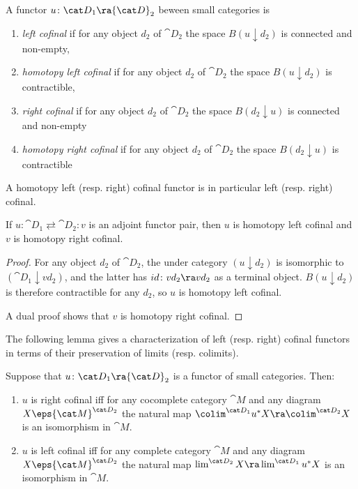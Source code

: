 \begin{defn}
\label{defn:coffunct}
A functor $u \colon {\cat D}_1 \ra {\cat D}_2$ beween small categories is
\begin{enumerate}
\item
{\it left cofinal} if for any object $d_2$ of ${\cat D}_2$ the space $B(u \downarrow d_2)$ is connected and non-empty,
\item
{\it homotopy left cofinal} if for any object $d_2$ of ${\cat D}_2$ the space $B(u \downarrow d_2)$ is contractible,
\item
{\it right cofinal} if for any object $d_2$ of ${\cat D}_2$ the space $B(d_2 \downarrow u)$ is connected and non-empty
\item
{\it homotopy right cofinal} if for any object $d_2$ of ${\cat D}_2$ the space $B(d_2 \downarrow u)$ is contractible
\end{enumerate}
\end{defn}

A homotopy left (resp. right) cofinal functor is in particular left (resp. right) cofinal. 

\begin{lem}
\label{lem::adjfunctcofinalfunct}
If $u : {\cat D}_1 \rightleftarrows {\cat D}_2 : v$ is an adjoint functor pair, then $u$ is homotopy left cofinal and $v$ is homotopy right cofinal.
\end{lem}
\begin{proof}
For any object $d_2$ of ${\cat D}_2$, the under category $(u \downarrow d_2)$ is isomorphic to $({\cat D}_1 \downarrow vd_2)$, and the latter has $id \colon vd_2 \ra vd_2$ as a terminal object. $B(u \downarrow d_2)$ is therefore contractible for any $d_2$, so $u$ is homotopy left cofinal.

A dual proof shows that $v$ is homotopy right cofinal.
\end{proof}

The following lemma gives a characterization of left (resp. right) cofinal functors in terms of their preservation of limits (resp. colimits).

\begin{prop}
\label{prop:cofinallimitconv}
Suppose that $u \colon {\cat D}_1 \ra {\cat D}_2$ is a functor of small categories. Then:
\begin{enumerate}
\item
$u$ is right cofinal iff for any cocomplete category ${\cat M}$ and any diagram $X \eps {\cat M}^{{\cat D}_2}$ the natural map $\colim^{{\cat D}_1}u^*X \ra \colim^{{\cat D}_2}X$ is an isomorphism in ${\cat M}$.
\item
$u$ is left cofinal iff for any complete category ${\cat M}$ and any diagram $X \eps {\cat M}^{{\cat D}_2}$ the natural map $\lim^{{\cat D}_2}X \ra \lim^{{\cat D}_1}u^*X$ is an isomorphism in ${\cat M}$.
\end{enumerate}
\end{prop}

